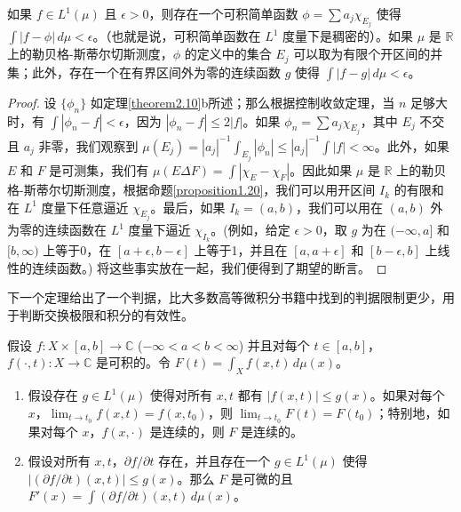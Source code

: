 \documentclass[lang=cn,10pt,thmcnt=section]{elegantbook}
\begin{document}
\begin{theorem}\label{theorem2.26}
如果 $f \in L^1(\mu)$ 且 $\epsilon > 0$，则存在一个可积简单函数 $\phi = \sum a_j \chi_{E_j}$ 使得 $\int |f - \phi| \,d\mu < \epsilon$。（也就是说，可积简单函数在 $L^1$ 度量下是稠密的）。如果 $\mu$ 是 $\mathbb{R}$ 上的勒贝格-斯蒂尔切斯测度，$\phi$ 的定义中的集合 $E_j$ 可以取为有限个开区间的并集；此外，存在一个在有界区间外为零的连续函数 $g$ 使得 $\int |f-g| \,d\mu < \epsilon$。
\end{theorem}

\begin{proof}
设 $\{\phi_n\}$ 如定理\ref{theorem2.10}b所述；那么根据控制收敛定理，当 $n$ 足够大时，有 $\int |\phi_n - f| < \epsilon$，因为 $|\phi_n - f| \le 2|f|$。如果 $\phi_n = \sum a_j \chi_{E_j}$，其中 $E_j$ 不交且 $a_j$ 非零，我们观察到 $\mu(E_j) = |a_j|^{-1} \int_{E_j} |\phi_n| \le |a_j|^{-1} \int |f| < \infty$。此外，如果 $E$ 和 $F$ 是可测集，我们有 $\mu(E \Delta F) = \int |\chi_E - \chi_F|$。因此如果 $\mu$ 是 $\mathbb{R}$ 上的勒贝格-斯蒂尔切斯测度，根据命题\ref{proposition1.20}，我们可以用开区间 $I_k$ 的有限和在 $L^1$ 度量下任意逼近 $\chi_{E_j}$。最后，如果 $I_k=(a,b)$，我们可以用在 $(a,b)$ 外为零的连续函数在 $L^1$ 度量下逼近 $\chi_{I_k}$。(例如，给定 $\epsilon > 0$，取 $g$ 为在 $(-\infty, a]$ 和 $[b, \infty)$ 上等于0，在 $[a+\epsilon, b-\epsilon]$ 上等于1，并且在 $[a, a+\epsilon]$ 和 $[b-\epsilon, b]$ 上线性的连续函数。) 将这些事实放在一起，我们便得到了期望的断言。
\end{proof}

下一个定理给出了一个判据，比大多数高等微积分书籍中找到的判据限制更少，用于判断交换极限和积分的有效性。

\begin{theorem}\label{theorem2.27}
假设 $f: X \times [a,b] \to \mathbb{C}$ ($-\infty < a < b < \infty$) 并且对每个 $t \in [a,b]$，$f(\cdot, t) : X \to \mathbb{C}$ 是可积的。令 $F(t) = \int_X f(x,t) \,d\mu(x)$。
\begin{enumerate}[label=\alph*.]
    \item 假设存在 $g \in L^1(\mu)$ 使得对所有 $x,t$ 都有 $|f(x,t)| \le g(x)$。如果对每个 $x$，$\lim_{t\to t_0} f(x,t) = f(x,t_0)$，则 $\lim_{t\to t_0} F(t) = F(t_0)$；特别地，如果对每个 $x$，$f(x, \cdot)$ 是连续的，则 $F$ 是连续的。
    \item 假设对所有 $x,t$，$\partial f/\partial t$ 存在，并且存在一个 $g \in L^1(\mu)$ 使得 $|(\partial f/\partial t)(x,t)| \le g(x)$。那么 $F$ 是可微的且 $F'(x) = \int (\partial f/\partial t)(x,t) \,d\mu(x)$。
\end{enumerate}
\end{theorem}
\end{document}
